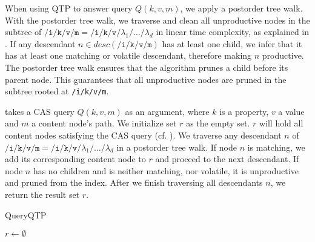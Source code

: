 \documentclass[abstracton,12pt]{scrartcl}
\theoremstyle{definition}
\begin{document}
When using QTP to answer query $Q(k,v,m)$, we apply a postorder tree walk.
With the postorder tree walk, we traverse and clean all unproductive nodes in
the subtree of $\texttt{/i/k/v/m} =
\texttt{/i/k/v/} \lambda_1 \texttt{/} \dots \texttt{/} \lambda_d$ in linear time
complexity, as explained in . If any descendant $n \in
desc(\texttt{/i/k/v/m})$ has at least one child, we
infer that it has at least one matching or volatile descendant, therefore making
$n$ productive. The postorder tree walk ensures that the algorithm prunes
a child before its parent node. This guarantees that all unproductive nodes are
pruned in the subtree rooted at \texttt{/i/k/v/m}.

 takes a CAS query $Q(k,v,m)$ as an argument, where
$k$ is a property, $v$ a value and $m$ a content node's path. We initialize set $r$
as the empty set. $r$ will hold all content nodes satisfying the CAS query (cf.
).
We traverse any descendant $n$ of $\texttt{/i/k/v/m} =
\texttt{/i/k/v/}\lambda_1\texttt{/}\dots\texttt{/}\lambda_d$ in a postorder tree
walk. If node $n$ is matching, we add its corresponding content node to
$r$ and proceed to the next descendant. If node $n$ has no children and is
neither matching, nor volatile, it is unproductive and pruned from the index.
After we finish traversing all descendants $n$, we return the result set $r$.

\begin{algorithm}
  \caption{QueryQTP}
  \DontPrintSemicolon
  $r \longleftarrow \emptyset$\;
  \;
  \label{algo:query_qtp_wapi}
\end{algorithm}
\end{document}

